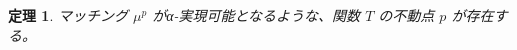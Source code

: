 \documentclass[12pt, a4paper]{article}
\theoremstyle{definition}
\theoremstyle{remark}
\theoremstyle{plain}
\newtheorem{theorem}{定理}
\begin{document}









\begin{theorem}
マッチング \( \mu^p \) がα-実現可能となるような、関数 \( T \) の不動点 \( p \) が存在する。
\end{theorem}
\end{document}
